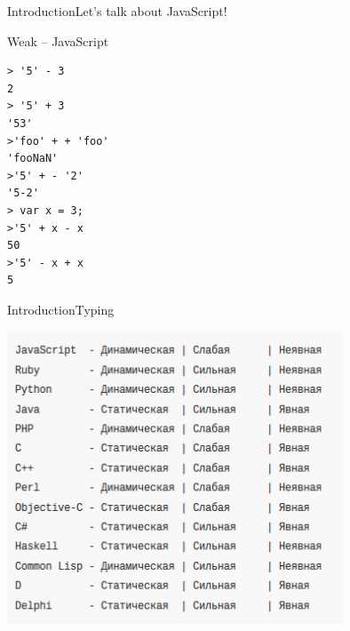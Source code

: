 \documentclass[10pt]{beamer}
\begin{document}
\begin{frame}[fragile]{Introduction}{Let's talk about JavaScript!}
\begin{center}
		
\begin{block}{Weak -- JavaScript}
			
\begin{lstlisting}
> '5' - 3
2
> '5' + 3
'53'
>'foo' + + 'foo'
'fooNaN'
>'5' + - '2'
'5-2'
> var x = 3;
>'5' + x - x
50
>'5' - x + x
5
\end{lstlisting}
			
			
\end{block}
		
\end{center}
	
\end{frame}


\begin{frame}{Introduction}{Typing}
	\begin{center}
		\includegraphics[width=0.75\textwidth]{pictures/typing.png}
	\end{center}
\end{frame}
\end{document}
